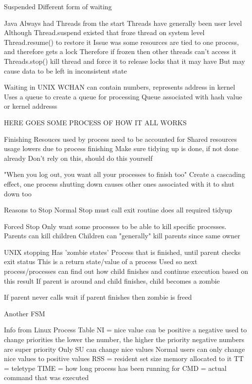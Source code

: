 \documentclass{article}
\begin{document}
	Suspended
		Different form of waiting

	Java
		Always had Threads from the start
		Threads have generally been user level
		Although Thread.suspend existed that froze thread on system level
			Thread.resume() to restore it
			Issue was some resources are tied to one process, and therefore gets a lock
			Therefore if frozen then other threads can't access it
		Threads.stop() kill thread and force it to release locks that it may have
			But may cause data to be left in inconsistent state

	Waiting in UNIX
		WCHAN can contain numbers, represents address in kernel
		Uses a queue to create a queue for processing
		Queue associated with hash value or kernel addresss

		HERE GOES SOME PROCESS OF HOW IT ALL WORKS

	Finishing
		Resouces used by process need to be accounted for
		Shared resources usage lowers due to process finishing
		Make sure tidying up is done, if not done already
			Don't rely on this, should do this yourself

		"When you log out, you want all your processes to finish too"
			Create a cascading effect, one process shutting down causes other ones associated with it to shut down too

	Reasons to Stop
		Normal Stop
			must call exit routine
			does all required tidyup

		Forced Stop
			Only want some processes to be able to kill specific processes.
				Parents can kill children
				Children can "generally" kill parents since same owner

	UNIX stopping
		Has 'zombie states'
			Process that is finished, until parent checks exit status
		This is a return state/value of a process
		Used so next process/processes can find out how child finishes and continue execution based on this result
		If parent is around and child finishes, child becomes a zombie

		If parent never calls wait
			if parent finishes then zombie is freed

	Another FSM

	Info from Linux Process Table
		NI = nice value
			can be positive a negative
			used to change priorities
				the lower the number, the higher the priority
				negative numbers are super priority
			Only SU can change nice values
			Normal users can only change nice values to positive values
		RSS = resident set size
			memory allocated to it
		TT = teletype
		TIME = how long process has been running for
		CMD = actual command that was executed
\end{document}
